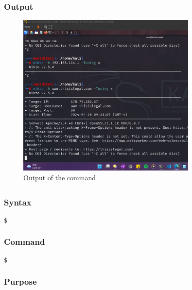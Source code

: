 \documentclass[11pt]{article}
\begin{document}
\subsubsection*{Output}
\begin{figure}[H]
    \centering
    \includegraphics[width=0.8\textwidth]{assignment 8.png}
    \caption{Output of the command}
    \label{fig:1}
\end{figure}

\subsection{}

\subsubsection*{Syntax}
\begin{verbatim}
$
\end{verbatim}

\subsubsection*{Command}
\begin{verbatim}
$
\end{verbatim}

\subsubsection*{Purpose}
\end{document}
